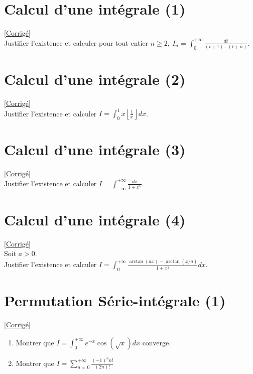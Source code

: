 \documentclass{book}
\begin{document}
	\section{Calcul d'une intégrale (1) }
	\textcolor{blue}{\hyperref[sec:calcul-dune-integrale-1-etoile3]{[Corrigé]}}\\
	\label{calculintégrale1}
	\label{Calcul d'une intégrale 1}
	Justifier l'existence et calculer pour tout entier $n\geq 2,\ I_n=\displaystyle\int_0^{+\infty}\frac{dt}{(t+1)\dots(t+n)}$.
	
	\section{Calcul d'une intégrale (2) }
	\textcolor{blue}{\hyperref[sec:calcul-dune-integrale-2-etoile2]{[Corrigé]}}\\
	\label{calculintégrale2}
	\label{Calcul d'une intégrale 2}
	Justifier l'existence et calculer $I=\displaystyle\int_0^1x\left\lfloor\frac{1}{x}\right\rfloor dx$.
	
	\section{Calcul d'une intégrale (3) }
	\textcolor{blue}{\hyperref[sec:calcul-dune-integrale-3]{[Corrigé]}}\\
	\label{calculintégrale3}
	\label{Calcul d'une intégrale 3}
	Justifier l'existence et calculer $I=\displaystyle\int_{-\infty}^{+\infty}\frac{dx}{1+x^6}$.
	
	\section{Calcul d'une intégrale (4) }
	\textcolor{blue}{\hyperref[sec:calcul-dune-integrale-4]{[Corrigé]}}\\
	\label{calculintégrale4}
	\label{Calcul d'une intégrale 4}
	Soit $a>0$.\\
	Justifier l'existence et calculer $I=\displaystyle\int_0^{+\infty}\frac{\arctan(ax)-\arctan(x/a)}{1+x^2}dx$.

	\section{Permutation Série-intégrale (1)}
	\textcolor{blue}{\hyperref[sec:permutation-serie-integrale-1]{[Corrigé]}}\\
	\label{ccinpmp2024}
	\label{Permutation Série-Intégrale 1}
	\begin{enumerate}
		\item Montrer que $\displaystyle I=\int_0^{+\infty}e^{-x}\cos(\sqrt{x})dx$ converge.
		\item Montrer que $\displaystyle I=\sum_{n=0}^{+\infty}\frac{(-1)^nn!}{(2n)!}$
	\end{enumerate}
	
\end{document}
